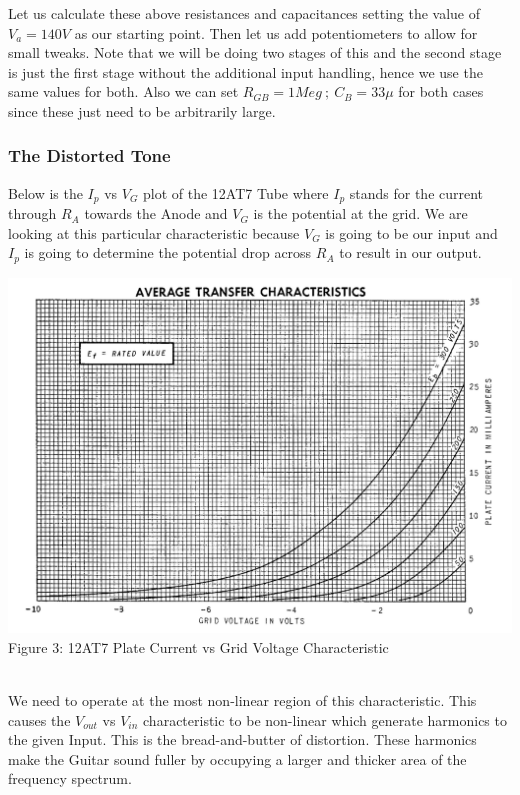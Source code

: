 \documentclass[11pt]{article}
\newcommand{\tab}{\hspace*{6mm}}
\begin{document}
\tab Let us calculate these above resistances and capacitances setting the value of $V_a = 140V$ as our starting point. Then let us add potentiometers to allow for small tweaks. Note that we will be doing two stages of this and the second stage is just the first stage without the additional input handling, hence we use the same values for both. Also we can set $R_{GB} = 1Meg \ ; \ C_B = 33\mu$ for both cases since these just need to be arbitrarily large. 
\newpage
\subsubsection{The Distorted Tone}
\tab Below is the $I_p$ vs $V_G$ plot of the 12AT7 Tube where $I_p$ stands for the current through $R_A$ towards the Anode and $V_G$ is the potential at the grid. We are looking at this particular characteristic because $V_G$ is going to be our input and $I_p$ is going to determine the potential drop across $R_A$ to result in our output.
\begin{center}
    \includegraphics[width=\textwidth]{Documentation LaTeX/Ip_v_Vg.png}\\
    \small{Figure 3: 12AT7 Plate Current vs Grid Voltage Characteristic}
\end{center}~\\
\tab We need to operate at the most non-linear region of this characteristic. This causes the $V_{out}$ vs $V_{in}$ characteristic to be non-linear which generate harmonics to the given Input. This is the bread-and-butter of distortion. These harmonics make the Guitar sound fuller by occupying a larger and thicker area of the frequency spectrum. \\~\\
\end{document}
